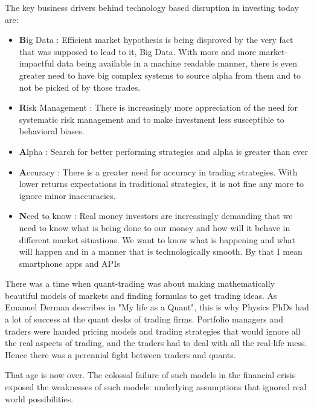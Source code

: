 \documentclass[a4paper]{article}
\begin{document}
The key business drivers behind technology based disruption in investing today are: 
\begin{itemize}
	\item \textbf{B}ig Data : Efficient market hypothesis is being disproved by the very fact that was supposed to lead to it, Big Data. With more and more market-impactful data being available in a machine readable manner, there is even greater need to have big complex systems to source alpha from them and to not be picked of by those trades.
	\item \textbf{R}isk Management : There is increasingly more appreciation of the need for systematic risk management and to make investment less susceptible to behavioral biases.
	\item \textbf{A}lpha : Search for better performing strategies and alpha is greater than ever
	\item \textbf{A}ccuracy : There is a greater need for accuracy in trading strategies. With lower returns expectations in traditional strategies, it is not fine any more to ignore minor inaccuracies.
	\item \textbf{N}eed to know : Real money investors are increasingly demanding that we need to know what is being done to our money and how will it behave in different market situations. We want to know what is happening and what will happen and in a manner that is technologically smooth. By that I mean smartphone apps and APIs
\end{itemize}


There was a time when quant-trading was about making mathematically beautiful models of markets and finding formulas to get trading ideas. As Emanuel Derman describes in "My life as a Quant", this is why Physics PhDs had a lot of success at the quant desks of trading firms. Portfolio managers and traders were handed pricing models and trading strategies that would ignore all the real aspects of trading, and the traders had to deal with all the real-life mess. Hence there was a perennial fight between traders and quants.

That age is now over. The colossal failure of such models in the financial crisis exposed the weaknesses of such models: underlying assumptions that ignored real world possibilities.
\end{document}

